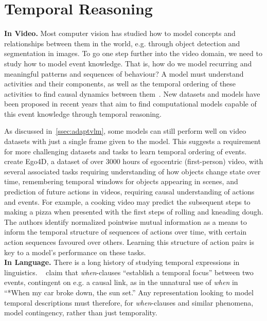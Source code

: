 \section{Temporal Reasoning}
\label{sec:tempreason}


\noindent\textbf{In Video.}\hspace{0.2cm}
Most computer vision has studied how to model concepts and relationships
between them in the world, e.g. through object detection and segmentation in
images. To go one step further into the video domain, we need to study how to
model event knowledge. That is, how do we model recurring and meaningful
patterns and sequences of behaviour? A model must understand activities and
their components, as well as the temporal ordering of these activities to find
causal dynamics between them~\citep{elman2019event}. New datasets and models
have been proposed in recent years that aim to find computational models
capable of this event knowledge through temporal reasoning. 

As discussed in~\cref{ssec:adaptvlm}, some models can still perform well on
video datasets with just a single frame given to the model. This suggests a
requirement for more challenging datasets and tasks to learn temporal ordering
of events. \citet{grauman2022ego4d} create Ego4D, a dataset of over 3000 hours
of egocentric (first-person) video, with several associated tasks requiring
understanding of how objects change state over time, remembering temporal
windows for objects appearing in scenes, and prediction of future actions in
videos, requiring causal understanding of actions and events. For example, a
cooking video may predict the subsequent steps to making a pizza when presented
with the first steps of rolling and kneading dough. The authors identify
normalized pointwise mutual information as a means to inform the temporal
structure of sequences of actions over time, with certain action sequences
favoured over others. Learning this structure of action pairs is key to a
model's performance on these tasks.\\

\noindent\textbf{In Language.}\hspace{0.2cm}
There is a long history of studying temporal expressions in linguistics.
~\citet{moens1988temporal} claim that \textit{when}-clauses ``establish a
temporal focus'' between two events, contingent on e.g. a causal link, as in
the unnatural use of \textit{when} in ``*When my car broke down, the sun set.''
Any representation looking to model temporal descriptions must therefore, for
\textit{when}-clauses and similar phenomena, model contingency, rather than
just temporality.

